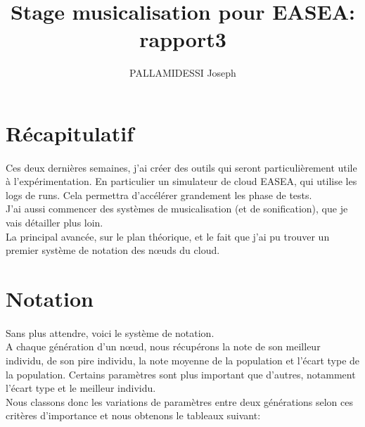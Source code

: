 \documentclass{article}
\begin{document}
  \title{Stage musicalisation pour EASEA: \\
    \large rapport3}
  \author{PALLAMIDESSI Joseph}
  \maketitle
  \newpage

  \section{Récapitulatif} %
  \label{sec:Récapitulatif}
    \paragraph{} %
    \label{par:}
    
      Ces deux dernières semaines, j'ai créer des outils qui seront particulièrement
      utile à l'expérimentation. En particulier un simulateur de cloud EASEA, qui
      utilise les logs de runs. Cela permettra d'accélérer grandement les phase de tests.\\
      J'ai aussi commencer des systèmes de musicalisation (et de sonification), que je
      vais détailler plus loin.\\
      La principal avancée, sur le plan théorique, et le fait que j'ai pu trouver un
      premier système de notation des nœuds du cloud.

  \section{Notation} %
  \label{sec:Notation}
    \paragraph{} %
    \label{par:}
      Sans plus attendre, voici le système de notation.\\
      A chaque génération d'un nœud, nous récupérons la note de son meilleur
      individu, de son pire individu, la note moyenne de la population et
      l'écart type de la population. Certains paramètres sont plus important que
      d'autres, notamment l'écart type et le meilleur individu. \\
      Nous classons
      donc les variations de paramètres entre deux générations selon ces critères
      d'importance et nous obtenons le tableaux suivant: 
\end{document}
